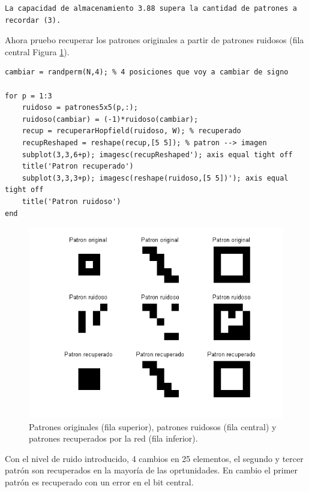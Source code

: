 \documentclass[11pt,a4paper,final]{article}
\begin{document}
\begin{verbatim}La capacidad de almacenamiento 3.88 supera la cantidad de patrones a recordar (3).
\end{verbatim}
    
Ahora pruebo recuperar los patrones originales a partir de patrones ruidosos (fila central Figura \ref{fig:ejercicio62}).

\begin{verbatim}
cambiar = randperm(N,4); % 4 posiciones que voy a cambiar de signo

for p = 1:3
    ruidoso = patrones5x5(p,:);
    ruidoso(cambiar) = (-1)*ruidoso(cambiar);
    recup = recuperarHopfield(ruidoso, W); % recuperado
    recupReshaped = reshape(recup,[5 5]); % patron --> imagen
    subplot(3,3,6+p); imagesc(recupReshaped'); axis equal tight off
    title('Patron recuperado')
    subplot(3,3,3+p); imagesc(reshape(ruidoso,[5 5])'); axis equal tight off
    title('Patron ruidoso')
end
\end{verbatim}

\begin{figure}
\includegraphics [width=\textwidth]{Ejercicio6_02.png}
\caption{Patrones originales (fila superior), patrones ruidosos (fila central) y  patrones recuperados por la red (fila inferior).}
\label{fig:ejercicio62}
\end{figure}

Con el nivel de ruido introducido, 4 cambios en 25 elementos, el segundo y tercer patrón son recuperados en la mayoría de las oprtunidades. En cambio el primer patrón es recuperado con un error en el bit central.
\end{document}
